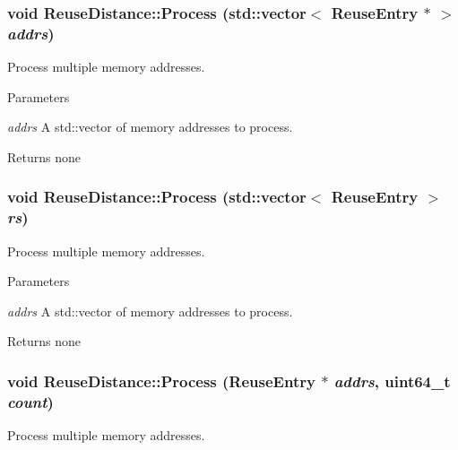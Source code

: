 \hypertarget{class_reuse_distance_a88052f5ae1e69bab8fe1f9b7b87c1037}{
\subsubsection[{Process}]{\setlength{\rightskip}{0pt plus 5cm}void ReuseDistance::Process (std::vector$<$ {\bf ReuseEntry} $\ast$ $>$ {\em addrs})}}
\label{class_reuse_distance_a88052f5ae1e69bab8fe1f9b7b87c1037}
Process multiple memory addresses.


\begin{DoxyParams}{Parameters}
\item[{\em addrs}]A std::vector of memory addresses to process.\end{DoxyParams}
\begin{DoxyReturn}{Returns}
none 
\end{DoxyReturn}
\hypertarget{class_reuse_distance_a372960c10d5fb6552c8dfcfd77da38ba}{
\subsubsection[{Process}]{\setlength{\rightskip}{0pt plus 5cm}void ReuseDistance::Process (std::vector$<$ {\bf ReuseEntry} $>$ {\em rs})}}
\label{class_reuse_distance_a372960c10d5fb6552c8dfcfd77da38ba}
Process multiple memory addresses.


\begin{DoxyParams}{Parameters}
\item[{\em addrs}]A std::vector of memory addresses to process.\end{DoxyParams}
\begin{DoxyReturn}{Returns}
none 
\end{DoxyReturn}
\hypertarget{class_reuse_distance_aed9cbdd99de67972a37de4624614de9d}{
\subsubsection[{Process}]{\setlength{\rightskip}{0pt plus 5cm}void ReuseDistance::Process ({\bf ReuseEntry} $\ast$ {\em addrs}, \/  uint64\_\-t {\em count})}}
\label{class_reuse_distance_aed9cbdd99de67972a37de4624614de9d}
Process multiple memory addresses.


